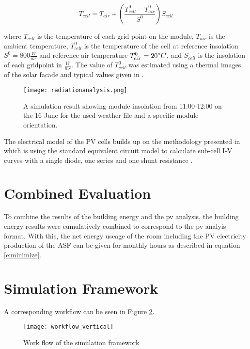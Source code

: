 		\begin{equation}
			T_{cell} = T_{air} + \left(\frac{T_{cell}^0-T_{air}^0}{S^0}\right)S_{cell}
      		\label{e:temp}
		\end{equation}

		where $T_{cell}$ is the temperature of each grid point on the module, $T_{air}$ is the ambient temperature, $T_{cell}^0$ is the temperature of the cell at reference insolation $S^0=800\frac{W}{m^2}$ and reference air temperature $T_{air}^0=20\degree C$, and $S_{cell}$ is the insolation of each gridpoint in $\frac{W}{m^2}$. The value of $T_{cell}^0$ was estimated using a thermal images of the solar facade and typical values given in \cite{Ross_Smokler_1986}. 

		\begin{figure}[H]
		\begin{center}
			\texttt{[image: radiationanalysis.png]}
			\caption{A simulation result showing module insolation from 11:00-12:00 on the 16 June for the used weather file and a specific module orientation.}
			\label{fig:radiation}
		\end{center}
		\end{figure}

		The electrical model of the PV cells builds up on the methodology presented in \cite{hofer2015PVSEC} which is using the standard equivalent circuit model to calculate sub-cell I-V curves with a single diode, one series and one shunt resistance \cite{mermoud2010}. 

	\section{Combined Evaluation}
		To combine the results of the building energy and the pv analysis, the building energy results were cumulatively combined to correspond to the pv analyis format. With this, the net energy useage of the room including the PV electricity production of the ASF can be given for monthly hours as described in equation \ref{e:minimize}. 

	\section{Simulation Framework}
		A corresponding workflow can be seen in Figure \ref{fig:workflow}. 

		\begin{figure}[ht] %
		\begin{center}
			\texttt{[image: workflow\_vertical]}
			\caption{Work flow of the simulation framework}
			\label{fig:workflow}
		\end{center} 
		\end{figure}

